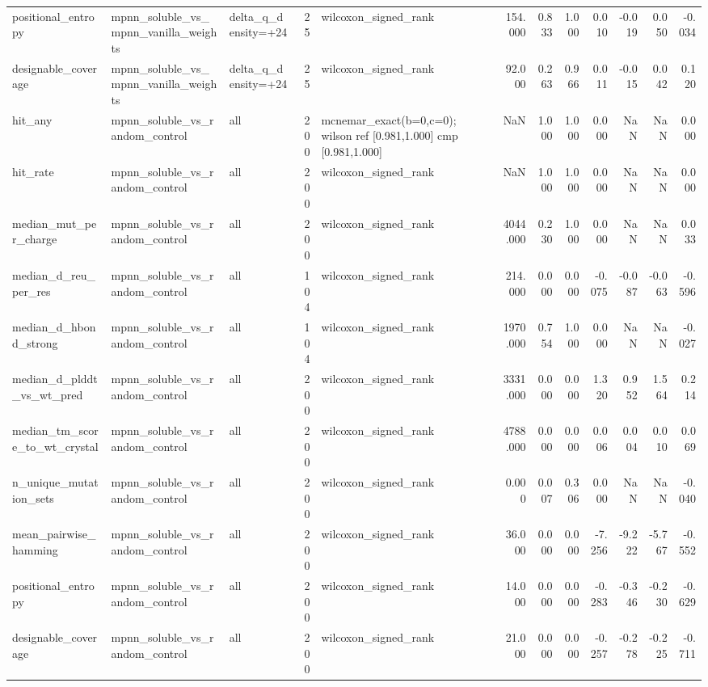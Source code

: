 \begin{table}
{\begin{tabular}{lllrlrrrrrrr}
positional\_entropy & mpnn\_soluble\_vs\_mpnn\_vanilla\_weights & delta\_q\_density=+24 & 25 & wilcoxon\_signed\_rank & 154.000 & 0.833 & 1.000 & 0.010 & -0.019 & 0.050 & -0.034 \\
designable\_coverage & mpnn\_soluble\_vs\_mpnn\_vanilla\_weights & delta\_q\_density=+24 & 25 & wilcoxon\_signed\_rank & 92.000 & 0.263 & 0.966 & 0.011 & -0.015 & 0.042 & 0.120 \\
hit\_any & mpnn\_soluble\_vs\_random\_control & all & 200 & mcnemar\_exact(b=0,c=0); wilson ref [0.981,1.000] cmp [0.981,1.000] & NaN & 1.000 & 1.000 & 0.000 & NaN & NaN & 0.000 \\
hit\_rate & mpnn\_soluble\_vs\_random\_control & all & 200 & wilcoxon\_signed\_rank & NaN & 1.000 & 1.000 & 0.000 & NaN & NaN & 0.000 \\
median\_mut\_per\_charge & mpnn\_soluble\_vs\_random\_control & all & 200 & wilcoxon\_signed\_rank & 4044.000 & 0.230 & 1.000 & 0.000 & NaN & NaN & 0.033 \\
median\_d\_reu\_per\_res & mpnn\_soluble\_vs\_random\_control & all & 104 & wilcoxon\_signed\_rank & 214.000 & 0.000 & 0.000 & -0.075 & -0.087 & -0.063 & -0.596 \\
median\_d\_hbond\_strong & mpnn\_soluble\_vs\_random\_control & all & 104 & wilcoxon\_signed\_rank & 1970.000 & 0.754 & 1.000 & 0.000 & NaN & NaN & -0.027 \\
median\_d\_plddt\_vs\_wt\_pred & mpnn\_soluble\_vs\_random\_control & all & 200 & wilcoxon\_signed\_rank & 3331.000 & 0.000 & 0.000 & 1.320 & 0.952 & 1.564 & 0.214 \\
median\_tm\_score\_to\_wt\_crystal & mpnn\_soluble\_vs\_random\_control & all & 200 & wilcoxon\_signed\_rank & 4788.000 & 0.000 & 0.000 & 0.006 & 0.004 & 0.010 & 0.069 \\
n\_unique\_mutation\_sets & mpnn\_soluble\_vs\_random\_control & all & 200 & wilcoxon\_signed\_rank & 0.000 & 0.007 & 0.306 & 0.000 & NaN & NaN & -0.040 \\
mean\_pairwise\_hamming & mpnn\_soluble\_vs\_random\_control & all & 200 & wilcoxon\_signed\_rank & 36.000 & 0.000 & 0.000 & -7.256 & -9.222 & -5.767 & -0.552 \\
positional\_entropy & mpnn\_soluble\_vs\_random\_control & all & 200 & wilcoxon\_signed\_rank & 14.000 & 0.000 & 0.000 & -0.283 & -0.346 & -0.230 & -0.629 \\
designable\_coverage & mpnn\_soluble\_vs\_random\_control & all & 200 & wilcoxon\_signed\_rank & 21.000 & 0.000 & 0.000 & -0.257 & -0.278 & -0.225 & -0.711 \\

\end{tabular}}
\end{table}

